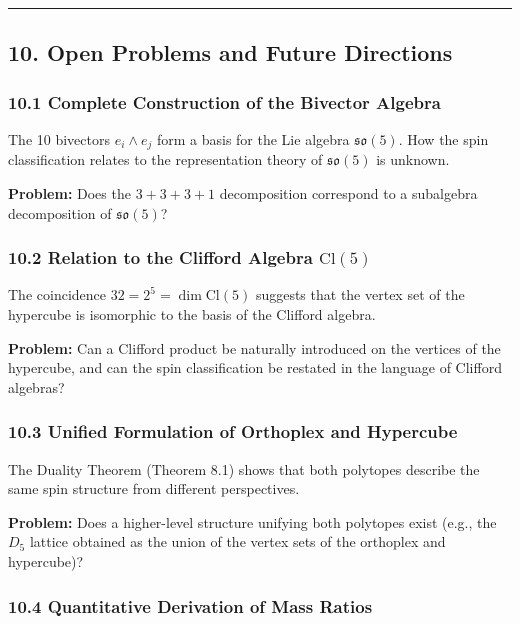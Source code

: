 \documentclass[a4paper,11pt]{article}
\begin{document}
\begin{center}\rule{0.5\linewidth}{0.5pt}\end{center}

\subsection*{10. Open Problems and Future Directions}

\subsubsection*{10.1 Complete Construction of the Bivector Algebra}

The 10 bivectors $e_i \wedge e_j$ form a basis for the Lie algebra $\mathfrak{so}(5)$. How the spin classification relates to the representation theory of $\mathfrak{so}(5)$ is unknown.

\textbf{Problem:} Does the $3 + 3 + 3 + 1$ decomposition correspond to a subalgebra decomposition of $\mathfrak{so}(5)$?

\subsubsection*{10.2 Relation to the Clifford Algebra $\mathrm{Cl}(5)$}

The coincidence $32 = 2^5 = \dim \mathrm{Cl}(5)$ suggests that the vertex set of the hypercube is isomorphic to the basis of the Clifford algebra.

\textbf{Problem:} Can a Clifford product be naturally introduced on the vertices of the hypercube, and can the spin classification be restated in the language of Clifford algebras?

\subsubsection*{10.3 Unified Formulation of Orthoplex and Hypercube}

The Duality Theorem (Theorem 8.1) shows that both polytopes describe the same spin structure from different perspectives.

\textbf{Problem:} Does a higher-level structure unifying both polytopes exist (e.g., the $D_5$ lattice obtained as the union of the vertex sets of the orthoplex and hypercube)?

\subsubsection*{10.4 Quantitative Derivation of Mass Ratios}
\end{document}
